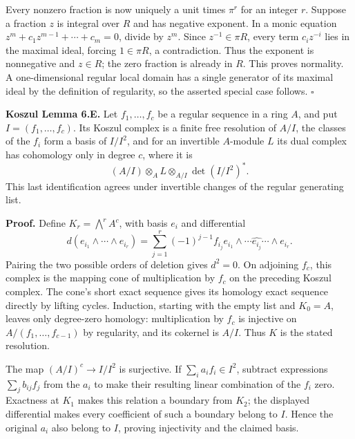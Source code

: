 \documentclass[11pt,a4paper,openany]{report}
\begin{document}
Every nonzero fraction is now uniquely a unit times \(\pi^r\) for an integer \(r\). Suppose a fraction \(z\) is integral over \(R\) and has negative exponent. In a monic equation \(z^m+c_1z^{m-1}+\cdots+c_m=0\), divide by \(z^m\). Since \(z^{-1}\in\pi R\), every term \(c_iz^{-i}\) lies in the maximal ideal, forcing \(1\in\pi R\), a contradiction. Thus the exponent is nonnegative and \(z\in R\); the zero fraction is already in \(R\). This proves normality. A one-dimensional regular local domain has a single generator of its maximal ideal by the definition of regularity, so the asserted special case follows. \(\square\)

\textbf{Koszul Lemma 6.E.} Let \(f_1,\ldots,f_c\) be a regular sequence in a ring \(A\), and put \(I=(f_1,\ldots,f_c)\). Its Koszul complex is a finite free resolution of \(A/I\), the classes of the \(f_i\) form a basis of \(I/I^2\), and for an invertible \(A\)-module \(L\) its dual complex has cohomology only in degree \(c\), where it is \[
(A/I)\otimes_A L\otimes_{A/I}\det(I/I^2)^*.
\] This last identification agrees under invertible changes of the regular generating list.

\textbf{Proof.} Define \(K_r=\bigwedge^r A^c\), with basis \(e_i\) and differential \[
d(e_{i_1}\wedge\cdots\wedge e_{i_r})
=\sum_{j=1}^r(-1)^{j-1}f_{i_j}
 e_{i_1}\wedge\cdots\widehat{e_{i_j}}\cdots\wedge e_{i_r}.
\] Pairing the two possible orders of deletion gives \(d^2=0\). On adjoining \(f_c\), this complex is the mapping cone of multiplication by \(f_c\) on the preceding Koszul complex. The cone's short exact sequence gives its homology exact sequence directly by lifting cycles. Induction, starting with the empty list and \(K_0=A\), leaves only degree-zero homology: multiplication by \(f_c\) is injective on \(A/(f_1,\ldots,f_{c-1})\) by regularity, and its cokernel is \(A/I\). Thus \(K\) is the stated resolution.

The map \((A/I)^c\to I/I^2\) is surjective. If \(\sum_i a_i f_i\in I^2\), subtract expressions \(\sum_j b_{ij}f_j\) from the \(a_i\) to make their resulting linear combination of the \(f_i\) zero. Exactness at \(K_1\) makes this relation a boundary from \(K_2\); the displayed differential makes every coefficient of such a boundary belong to \(I\). Hence the original \(a_i\) also belong to \(I\), proving injectivity and the claimed basis.
\end{document}
